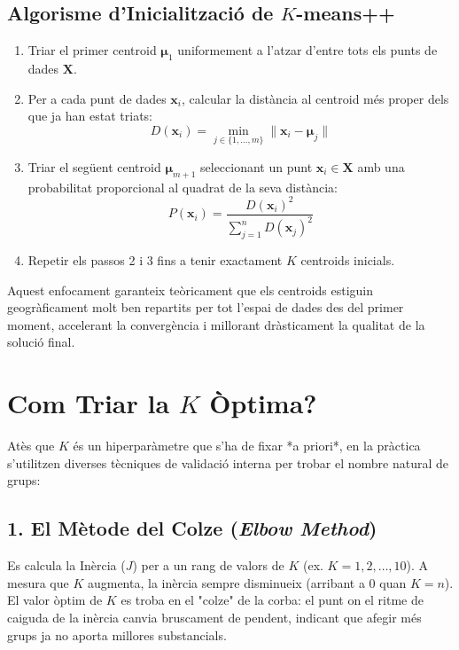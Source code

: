 \documentclass[11pt, a4paper]{article}
\begin{document}
\subsection{Algorisme d'Inicialització de $K$-means++}
\begin{enumerate}
    \item Triar el primer centroid $\boldsymbol{\mu}_1$ uniformement a l'atzar d'entre tots els punts de dades $\mathbf{X}$.
    \item Per a cada punt de dades $\mathbf{x}_i$, calcular la distància al centroid més proper dels que ja han estat triats:
    \[
    D(\mathbf{x}_i) = \min_{j \in \{1, \dots, m\}} \lVert \mathbf{x}_i - \boldsymbol{\mu}_j \rVert
    \]
    \item Triar el següent centroid $\boldsymbol{\mu}_{m+1}$ seleccionant un punt $\mathbf{x}_i \in \mathbf{X}$ amb una probabilitat proporcional al quadrat de la seva distància:
    \[
    P(\mathbf{x}_i) = \frac{D(\mathbf{x}_i)^2}{\sum_{j=1}^{n} D(\mathbf{x}_j)^2}
    \]
    \item Repetir els passos 2 i 3 fins a tenir exactament $K$ centroids inicials.
\end{enumerate}
Aquest enfocament garanteix teòricament que els centroids estiguin geogràficament molt ben repartits per tot l'espai de dades des del primer moment, accelerant la convergència i millorant dràsticament la qualitat de la solució final.

\section{Com Triar la $K$ Òptima?}

Atès que $K$ és un hiperparàmetre que s'ha de fixar *a priori*, en la pràctica s'utilitzen diverses tècniques de validació interna per trobar el nombre natural de grups:

\subsection{1. El Mètode del Colze (\textit{Elbow Method})}
Es calcula la Inèrcia ($J$) per a un rang de valors de $K$ (ex. $K = 1, 2, \dots, 10$). A mesura que $K$ augmenta, la inèrcia sempre disminueix (arribant a $0$ quan $K=n$). El valor òptim de $K$ es troba en el "colze" de la corba: el punt on el ritme de caiguda de la inèrcia canvia bruscament de pendent, indicant que afegir més grups ja no aporta millores substancials.
\end{document}
